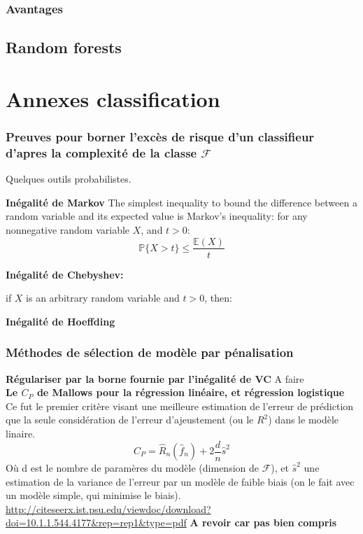 \documentclass[a4paper]{article}
\theoremstyle{plain}
\begin{document}
\subsubsection{Avantages}


\subsection{Random forests}






\pagebreak
\section{Annexes classification}

\subsubsection{Preuves pour borner l'excès de risque d'un classifieur d'apres la complexité de la classe $\mathcal{F}$}

Quelques outils probabilistes.

\textbf{Inégalité de Markov}
The simplest inequality to bound the difference between a random variable and its expected value is Markov's inequality: for any nonnegative random variable $X$, and $t > 0$:
$$\mathbb{P}\{{X>t}\}\leq \frac{\mathbb{E}(X)}{t}$$

\textbf{Inégalité de Chebyshev:}

if $X$ is an arbitrary random variable and $t > 0$, then:

\textbf{Inégalité de Hoeffding}



\subsubsection{Méthodes de sélection de modèle par pénalisation}
\label{Detail_penalisation}


\textbf{Régulariser par la borne fournie par l'inégalité de VC}
A faire\\

\textbf{Le $C_P$ de Mallows pour la régression linéaire, et régression logistique}
Ce fut le premier critère visant une meilleure estimation de l'erreur de prédiction que la seule considération de l'erreur d'ajeustement (ou le $R^2$) dans le modèle linaire.
$$ C_P = \hat R_n(\hat f_n)+2 \frac{d}{n} \hat s^2$$
Où d est le nombre de paramères du modèle (dimension de $\mathcal{F}$), et $\hat s^2$ une estimation de la variance de l'erreur par un modèle de faible biais (on le fait avec un modèle simple, qui minimise le biais).\\
\url{http://citeseerx.ist.psu.edu/viewdoc/download?doi=10.1.1.544.4177&rep=rep1&type=pdf}
\textbf{A revoir car pas bien compris}\\
\end{document}
